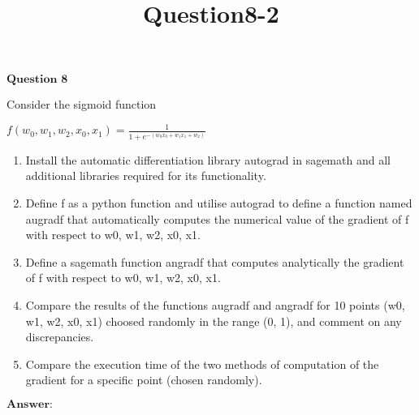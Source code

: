 \documentclass[11pt]{article}
\title{Question8-2}
\begin{document}
    

    
    $\textbf{Question 8}$

Consider the sigmoid function

$f(w_0, w_1, w_2, x_0, x_1) = \frac{1}{1 + e^{-(w_0x_0 + w_1x_1 + w_2)}}$

\begin{enumerate}
\def\labelenumi{(\alph{enumi})}
\item
  Install the automatic differentiation library autograd in sagemath and
  all additional libraries required for its functionality.
\item
  Define f as a python function and utilise autograd to define a
  function named augradf that automatically computes the numerical value
  of the gradient of f with respect to w0, w1, w2, x0, x1.
\item
  Define a sagemath function angradf that computes analytically the
  gradient of f with respect to w0, w1, w2, x0, x1.
\item
  Compare the results of the functions augradf and angradf for 10 points
  (w0, w1, w2, x0, x1) choosed randomly in the range (0, 1), and comment
  on any discrepancies.
\item
  Compare the execution time of the two methods of computation of the
  gradient for a specific point (chosen randomly).
\end{enumerate}

$\textbf{Answer:}$
\end{document}
